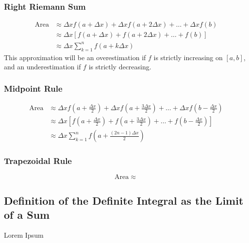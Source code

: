 \documentclass{artikel3}
\begin{document}
\subsubsection{Right Riemann Sum}
\begin{align*}
\mathrm{Area} &\approx \Delta xf(a+\Delta x)+\Delta xf(a+2\Delta x)
+\ldots+\Delta xf(b)\\
    &\approx \Delta x[f(a+\Delta x)+f(a+2\Delta x)+\ldots+f(b)]\\
    &\approx \Delta x \sum_{k=1}^{n} f(a+k\Delta x)
\end{align*}
This approximation will be an overestimation if $f$ is strictly increasing 
on $[a, b]$, and an underestimation if $f$ is strictly decreasing.

\subsubsection{Midpoint Rule}
\begin{align*}
\mathrm{Area} &\approx \Delta xf\left ( a+\frac{\Delta x}{2}\right )
+\Delta xf\left ( a+\frac{3\Delta x}{2}\right ) +\ldots
+\Delta xf\left ( b-\frac{\Delta x}{2}\right )\\
    &\approx \Delta x\left [ f\left ( a+\frac{\Delta x}{2}\right )
    +f\left ( a+\frac{3\Delta x}{2}\right )+\ldots
    +f\left ( b-\frac{\Delta x}{2}\right )\right ]\\
    &\approx \Delta x \sum_{k=1}^{n} f\left ( a+\frac{(2n-1)\Delta x}{2} \right )
\end{align*}

\subsubsection{Trapezoidal Rule}
\[ \mathrm{Area} \approx  \]
\subsection{Definition of the Definite Integral as the Limit of a Sum}

Lorem Ipsum
\end{document}
